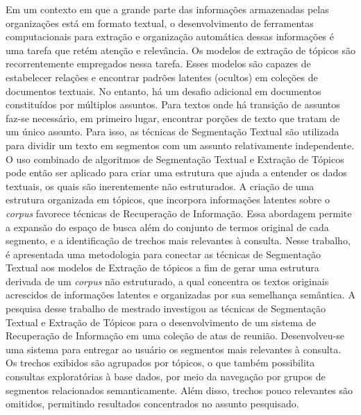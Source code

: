 \setlength{\absparsep}{18pt} %
                     
\begin{resumo}

Em um contexto em que a grande parte das informações armazenadas pelas organizações está em formato textual, o desenvolvimento de ferramentas computacionais para extração e organização automática dessas informações é uma tarefa que retém atenção e relevância.
%
Os modelos de extração de tópicos são recorrentemente empregados nessa tarefa. Esses modelos são capazes de estabelecer relações e encontrar padrões latentes (ocultos) em coleções de documentos textuais.
%
No entanto, há um desafio adicional em documentos constituídos por múltiplos assuntos. Para textos onde há transição de assuntos faz-se necessário, em primeiro lugar, encontrar porções de texto que tratam de um único assunto. Para isso, as técnicas de Segmentação Textual são utilizada para dividir um texto em segmentos com um assunto relativamente independente.
%
%
%
%
%
O uso combinado de algoritmos de Segmentação Textual e Extração de Tópicos pode então ser aplicado para criar uma estrutura que ajuda a entender os dados textuais, os quais são inerentemente não estruturados.
% 
A criação de uma estrutura organizada em tópicos, que incorpora informações latentes sobre o \textit{corpus} favorece técnicas de Recuperação de Informação. Essa abordagem permite a expansão do espaço de busca além do conjunto de termos original de cada segmento, e a identificação de trechos mais relevantes à consulta.
% 
Nesse trabalho, é apresentada uma metodologia para conectar as técnicas de Segmentação Textual aos modelos de Extração de tópicos a fim de gerar uma estrutura derivada de um \textit{corpus} não estruturado, a qual concentra os textos originais acrescidos de informações latentes e organizadas por sua semelhança semântica.
% 
% 
% 
% 
% 
% 
A pesquisa desse trabalho de mestrado investigou as técnicas de Segmentação Textual e Extração de Tópicos para o desenvolvimento de um sistema de Recuperação de Informação em uma coleção de atas de reunião. 
% 
Desenvolveu-se uma sistema para entregar ao usuário os segmentos mais relevantes à consulta. Os trechos exibidos são agrupados por tópicos, o que também possibilita consultas exploratórias à base dados, por meio da navegação por grupos de segmentos relacionados semanticamente. Além disso, trechos pouco relevantes são omitidos, permitindo resultados concentrados no assunto pesquisado.

\end{resumo}
